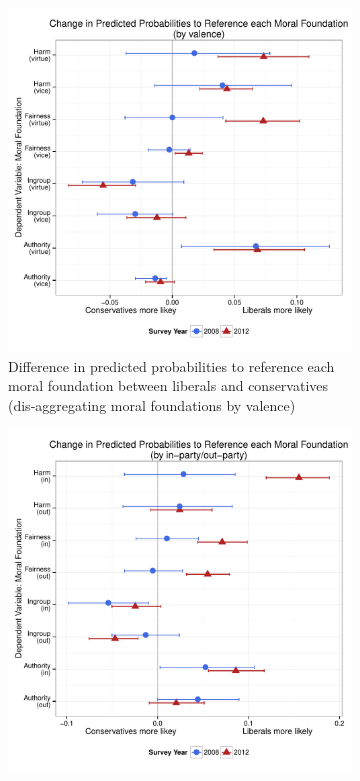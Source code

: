 \documentclass[12pt]{article}
\begin{document}
\begin{figure}[h]
  \centering
  \caption{INSERT DESCRIPTION}\label{fig:appD4toD6}
  \begin{subfigure}[t]{0.49\textwidth}
    \includegraphics[scale=.35]{../calc/fig/appD4val.pdf}
\caption{Difference in predicted probabilities to reference each moral foundation between liberals and conservatives (dis-aggregating moral foundations by valence)}\label{fig:appD4val}
  \end{subfigure}
  \begin{subfigure}[t]{0.49\textwidth}
    \includegraphics[scale=.35]{../calc/fig/appD5inout.pdf}

\end{subfigure}
\end{figure}
\end{document}
